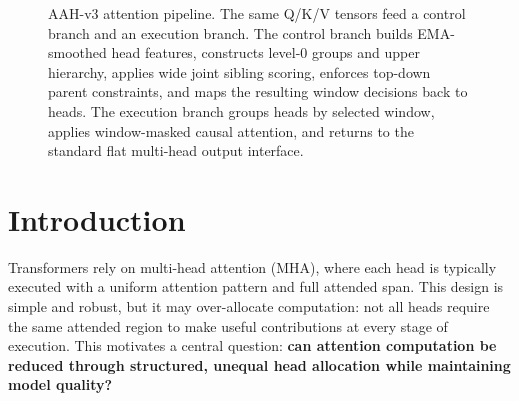 \documentclass[11pt]{article}
\begin{document}
\begin{figure}[p]
{%
  }
  \caption{AAH-v3 attention pipeline. The same Q/K/V tensors feed a control branch and an execution branch. The control branch builds EMA-smoothed head features, constructs level-0 groups and upper hierarchy, applies wide joint sibling scoring, enforces top-down parent constraints, and maps the resulting window decisions back to heads. The execution branch groups heads by selected window, applies window-masked causal attention, and returns to the standard flat multi-head output interface.}
  \label{fig:aah_v3_overview}
\end{figure}
\clearpage

\section{Introduction}

Transformers rely on multi-head attention (MHA), where each head is typically executed with a uniform attention pattern and full attended span. This design is simple and robust, but it may over-allocate computation: not all heads require the same attended region to make useful contributions at every stage of execution. This motivates a central question: \textbf{can attention computation be reduced through structured, unequal head allocation while maintaining model quality?}
\end{document}
